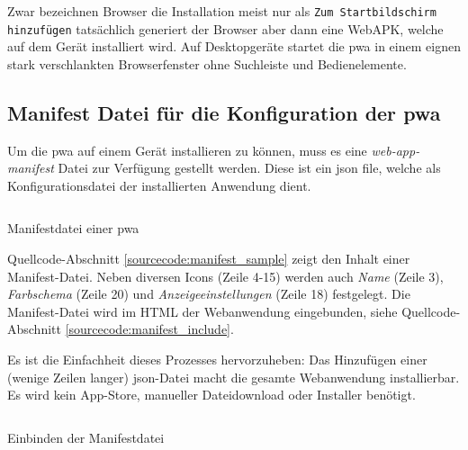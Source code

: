 Zwar bezeichnen Browser die Installation meist nur als \texttt{Zum Startbildschirm hinzufügen} tatsächlich generiert der Browser aber dann eine WebAPK, welche auf dem Gerät installiert wird. Auf Desktopgeräte startet die \ac{pwa} in einem eignen stark verschlankten Browserfenster ohne Suchleiste und Bedienelemente. \cite{GooglePWAInstallation}


\subsection{Manifest Datei für die Konfiguration der \ac{pwa}}

Um die \ac{pwa} auf einem Gerät installieren zu können, muss es eine \textit{web-app-manifest} Datei zur Verfügung gestellt werden. Diese ist ein \ac{json} file, welche als Konfigurationsdatei der installierten Anwendung dient. \cite{GooglePWAManifest}

\begin{listing}[H]
    \inputminted{json}{sourcecode/manifest_sample.json}
    \caption{Manifestdatei einer \ac{pwa}}
      \label{sourcecode:manifest_sample}
\end{listing}

Quellcode-Abschnitt \ref{sourcecode:manifest_sample} zeigt den Inhalt einer Manifest-Datei. Neben diversen Icons (Zeile 4-15) werden auch \textit{Name} (Zeile 3), \textit{Farbschema} (Zeile 20) und \textit{Anzeigeeinstellungen} (Zeile 18) festgelegt.
Die Manifest-Datei wird im HTML der Webanwendung eingebunden, siehe Quellcode-Abschnitt \ref{sourcecode:manifest_include}. 

Es ist die Einfachheit dieses Prozesses hervorzuheben: Das Hinzufügen einer (wenige Zeilen langer) \ac{json}-Datei macht die gesamte Webanwendung installierbar. Es wird kein App-Store, manueller Dateidownload oder Installer benötigt. 

\begin{listing}[H]
    \inputminted{xml}{sourcecode/include_manifest.html}
    \caption{Einbinden der Manifestdatei}
      \label{sourcecode:manifest_include}
\end{listing}



